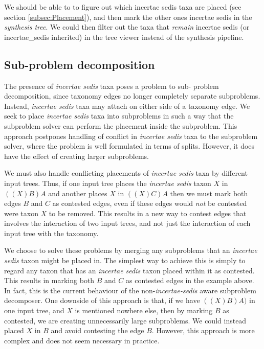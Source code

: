 \documentclass[english]{article}
\begin{document}
We should be able to to figure out which incertae sedis taxa are
placed (see section \ref{subsec:Placement}), and then mark the other
ones incertae sedis in the \emph{synthesis tree}.
We could then filter
out the taxa that \emph{remain }incertae sedis (or incertae\_sedis
inherited) in the tree viewer instead of the synthesis pipeline.

\subsection{Sub-problem decomposition}

The presence of \emph{incertae sedis }taxa poses a problem to sub-
problem decomposition, since taxonomy edges no longer completely
separate subproblems.
Instead, \emph{incertae sedis} taxa may attach
on either side of a taxonomy edge.
We seek to place \emph{incertae
sedis} taxa into subproblems in such a way that the subproblem solver
can perform the placement inside the subproblem.
This approach
postpones handling of conflict in \emph{incertae sedis} taxa to the
subproblem solver, where the problem is well formulated in terms of
splits.
However, it does have the effect of creating larger
subproblems.

We must also handle conflicting placements of \emph{incertae sedis}
taxa by different input trees.
Thus, if one input tree places the
\emph{incertae sedis} taxon $X$ in $((X)B)A$ and another places $X$ in
$((X)C)A$ then we must mark both edges $B$ and $C$ as contested edges,
even if these edges would \emph{not} be contested were taxon $X$ to be
removed.
This results in a new way to contest edges that involves the
interaction of two input trees, and not just the interaction of each
input tree with the taxonomy.

We choose to solve these problems by merging any subproblems that an
\emph{incertae sedis} taxon might be placed in.
The simplest way to
achieve this is simply to regard any taxon that has an \emph{incertae
sedis }taxon placed within it as contested.
This results in marking
both $B$ and $C$ as contested edges in the example above.
In fact,
this is the current behaviour of the non-\emph{incertae-sedis} aware
subproblem decomposer.
One downside of this approach is that, if we
have $((X)B)A)$ in one input tree, and $X$ is mentioned nowhere else,
then by marking $B$ as contested, we are creating unnecessarily large
subproblems.
We could instead placed $X$ in $B$ and avoid contesting
the edge $B$.
However, this approach is more complex and does not seem
necessary in practice.
\end{document}
